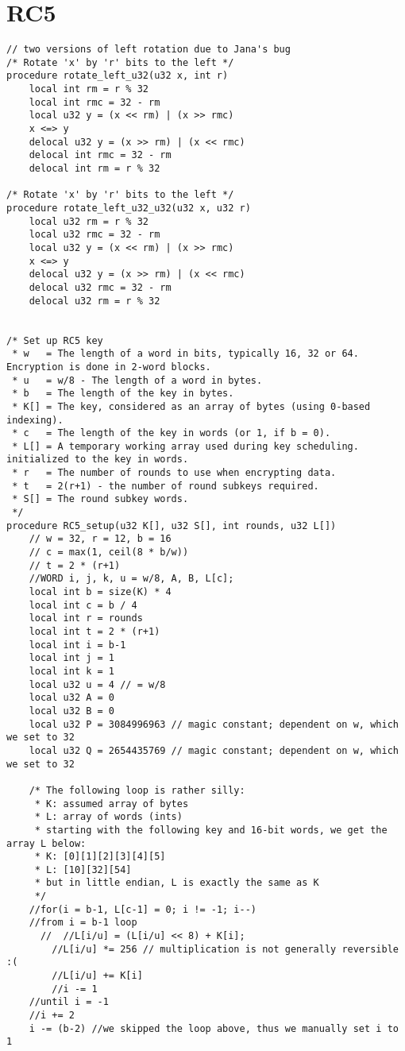 \documentclass[a4paper,10pt,openright]{memoir}
\begin{document}
\section{RC5}
\begin{lstlisting}[language=Janus,breaklines=true]
// two versions of left rotation due to Jana's bug
/* Rotate 'x' by 'r' bits to the left */
procedure rotate_left_u32(u32 x, int r)
    local int rm = r % 32
    local int rmc = 32 - rm
    local u32 y = (x << rm) | (x >> rmc)
    x <=> y
    delocal u32 y = (x >> rm) | (x << rmc)
    delocal int rmc = 32 - rm
    delocal int rm = r % 32

/* Rotate 'x' by 'r' bits to the left */
procedure rotate_left_u32_u32(u32 x, u32 r)
    local u32 rm = r % 32
    local u32 rmc = 32 - rm
    local u32 y = (x << rm) | (x >> rmc)
    x <=> y
    delocal u32 y = (x >> rm) | (x << rmc)
    delocal u32 rmc = 32 - rm
    delocal u32 rm = r % 32


/* Set up RC5 key
 * w   = The length of a word in bits, typically 16, 32 or 64. Encryption is done in 2-word blocks.
 * u   = w/8 - The length of a word in bytes.
 * b   = The length of the key in bytes.
 * K[] = The key, considered as an array of bytes (using 0-based indexing).
 * c   = The length of the key in words (or 1, if b = 0).
 * L[] = A temporary working array used during key scheduling. initialized to the key in words.
 * r   = The number of rounds to use when encrypting data.
 * t   = 2(r+1) - the number of round subkeys required.
 * S[] = The round subkey words.
 */
procedure RC5_setup(u32 K[], u32 S[], int rounds, u32 L[])
    // w = 32, r = 12, b = 16
    // c = max(1, ceil(8 * b/w))
    // t = 2 * (r+1)
    //WORD i, j, k, u = w/8, A, B, L[c];
    local int b = size(K) * 4
    local int c = b / 4
    local int r = rounds
    local int t = 2 * (r+1)
    local int i = b-1
    local int j = 1
    local int k = 1
    local u32 u = 4 // = w/8
    local u32 A = 0
    local u32 B = 0
    local u32 P = 3084996963 // magic constant; dependent on w, which we set to 32
    local u32 Q = 2654435769 // magic constant; dependent on w, which we set to 32
   
    /* The following loop is rather silly:
     * K: assumed array of bytes
     * L: array of words (ints)
     * starting with the following key and 16-bit words, we get the array L below:
     * K: [0][1][2][3][4][5] 
     * L: [10][32][54]
     * but in little endian, L is exactly the same as K
     */
    //for(i = b-1, L[c-1] = 0; i != -1; i--)
    //from i = b-1 loop
      //  //L[i/u] = (L[i/u] << 8) + K[i];
        //L[i/u] *= 256 // multiplication is not generally reversible :(
        //L[i/u] += K[i]
        //i -= 1
    //until i = -1
    //i += 2
    i -= (b-2) //we skipped the loop above, thus we manually set i to 1
   

\end{lstlisting}
\end{document}
